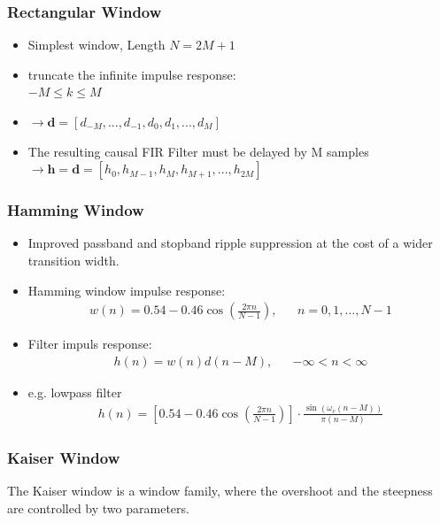 \subsubsection{Rectangular Window}
\begin{multicols}{2}
	\begin{itemize}
		\item Simplest window, Length $N = 2M+1$
		\item truncate the infinite impulse response: \\ $-M \leq k \leq M$
		\item $\rightarrow \mathbf{d} = [d_{-M}, ..., d_{-1}, d_0, d_1, ..., d_M]$
		\item The resulting causal FIR Filter must be delayed by M samples \newline
		$\rightarrow \mathbf{h} = \mathbf{d} = [h_0, h_{M-1}, h_M, h_{M+1}, ..., h_{2M}]$
	\end{itemize}

	\begin{center}
		
	\end{center}
\end{multicols}

\subsubsection{Hamming Window}
\begin{itemize}
	\item Improved passband and stopband ripple suppression at the cost of a wider transition width.
	\item Hamming window impulse response:
	\begin{align*}
		w(n) = 0.54 -0.46\cos\left(\frac{2\pi n}{N-1}\right),&&n= 0,1,\dots,N-1
	\end{align*}
	\item Filter impuls response:
	\begin{align*}
		h(n) = w(n)d(n-M),&&-\infty < n < \infty
	\end{align*}
	\item e.g. lowpass filter
	\begin{align*}
		h(n) = \left[0.54 -0.46\cos\left(\frac{2\pi n}{N-1}\right)\right]\cdot\frac{\sin(\omega_c(n-M))}{\pi (n-M)}
	\end{align*}
\end{itemize}

\newpage
\subsubsection{Kaiser Window}
The Kaiser window is a window family, where the overshoot and the steepness
are controlled by two parameters. \\


